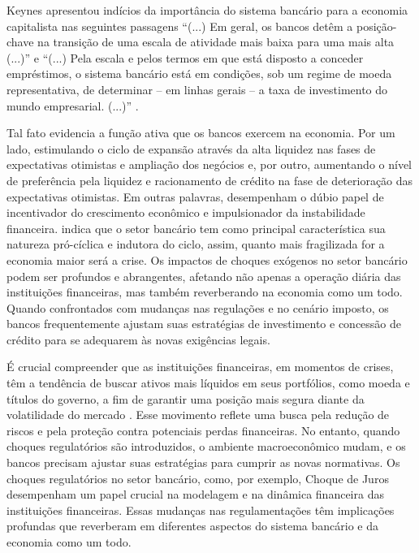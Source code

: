 \documentclass[hidelinks, article,12pt,oneside,a4paper,english,brazil,sumario=tradicional]{abntex2}
\begin{document}
Keynes apresentou indícios da importância do sistema bancário para a economia capitalista nas seguintes passagens “(...) Em geral, os bancos detêm a posição-chave na transição de uma escala de atividade mais baixa para uma mais alta (...)” \cite[p.668]{keynes1937alternative} e “(...) Pela escala e pelos termos em que está disposto a conceder empréstimos, o sistema bancário está em condições, sob um regime de moeda representativa, de determinar – em linhas gerais – a taxa de investimento do mundo empresarial. (...)” \cite[vol. 1, p.668]{keynes1930treatise}. 

Tal fato evidencia a função ativa que os bancos exercem na economia. Por um lado, estimulando o ciclo de expansão através da alta liquidez nas fases de expectativas otimistas e ampliação dos negócios e, por outro, aumentando o nível de preferência pela liquidez e racionamento de crédito na fase de deterioração das expectativas otimistas. Em outras palavras, desempenham o dúbio papel de incentivador do crescimento econômico e impulsionador da instabilidade financeira.  indica que o setor bancário tem como principal característica sua natureza pró-cíclica e indutora do ciclo, assim, quanto mais fragilizada for a economia maior será a crise. Os impactos de choques exógenos no setor bancário podem ser profundos e abrangentes, afetando não apenas a operação diária das instituições financeiras, mas também reverberando na economia como um todo. Quando confrontados com mudanças nas regulações e no cenário imposto, os bancos frequentemente ajustam suas estratégias de investimento e concessão de crédito para se adequarem às novas exigências legais.

É crucial compreender que as instituições financeiras, em momentos de crises, têm a tendência de buscar ativos mais líquidos em seus portfólios, como moeda e títulos do governo, a fim de garantir uma posição mais segura diante da volatilidade do mercado \cite{junior2019preferencia} \cite{paula1998comportamento}. Esse movimento reflete uma busca pela redução de riscos e pela proteção contra potenciais perdas financeiras. No entanto, quando choques regulatórios são introduzidos, o ambiente macroeconômico mudam, e os bancos precisam ajustar suas estratégias para cumprir as novas normativas. Os choques regulatórios no setor bancário, como, por exemplo, Choque de Juros desempenham um papel crucial na modelagem e na dinâmica financeira das instituições financeiras. Essas mudanças nas regulamentações têm implicações profundas que reverberam em diferentes aspectos do sistema bancário e da economia como um todo.
\end{document}
